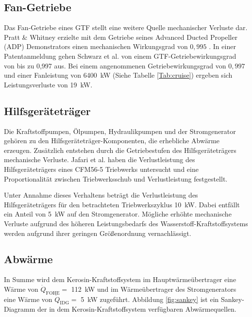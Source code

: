 \subsection{Fan-Getriebe}

Das Fan-Getriebe eines GTF stellt eine weitere Quelle mechanischer Verluste dar. Pratt \& Whitney erzielte mit dem Getriebe seines Advanced Ducted Propeller (ADP) Demonstrators einen mechanischen Wirkungsgrad von $0,995$ \cite{MCCUNE.1993}. In einer Patentanmeldung gehen Schwarz et al. \cite{Schwarz.2013} von einem GTF-Getriebewirkungsgrad von bis zu 0,997 aus. Bei einem angenommenen Getriebewirkungsgrad von $0,997$ und einer Fanleistung von \SI{6400}{\kilo\W} (Siehe Tabelle \ref{Tab:cruise}) ergeben sich Leistungsverluste von \SI{19}{\kilo\W}.

\subsection{Hilfsgeräteträger}

Die Kraftstoffpumpen, Ölpumpen, Hydraulikpumpen und der Stromgenerator gehören zu den Hilfsgeräteträger-Komponenten, die erhebliche Abwärme erzeugen. Zusätzlich entstehen durch die Getriebestufen des Hilfsgeräteträgers mechanische Verluste. Jafari et al. \cite{Jafari.2020} haben die Verlustleistung des Hilfsgeräteträgers eines CFM56-5 Triebwerks untersucht und eine Proportionalität zwischen Triebwerksschub und Verlustleistung festgestellt. 

Unter Annahme dieses Verhaltens beträgt die Verlustleistung des Hilfsgeräteträgers für den betrachteten Triebwerkszyklus \SI{10}{\kilo\W}. Dabei entfällt ein Anteil von \SI{5}{\kilo\W} auf den Stromgenerator. Mögliche erhöhte mechanische Verluste aufgrund des höheren Leistungsbedarfs des Wasserstoff-Kraftstoffsystems werden aufgrund ihrer geringen Größenordnung vernachlässigt. 


\subsection{Abwärme}

In Summe wird dem Kerosin-Kraftstoffsystem im Hauptwärmeübertrager eine Wärme von $\dot{Q}_{\mathrm{FOHE}}=$ \SI{112}{\kilo\W} und im Wärmeübertrager des Stromgenerators eine Wärme von $\dot{Q}_{\mathrm{IDG}}=$ \SI{5}{\kilo\W} zugeführt. Abbildung \ref{fig:sankey} ist ein Sankey-Diagramm der in dem Kerosin-Kraftstoffsystem verfügbaren Abwärmequellen.

